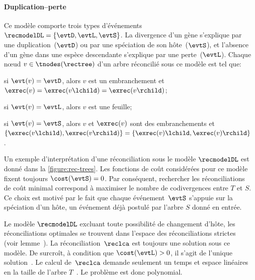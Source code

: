 \paragraph{Duplication--perte~\textup{\parencite{Goodman1979FittingGeneLineage,Page1994MapsTreesCladistic}}}
Ce modèle comporte trois types d’événements \(\recmodelDL = \{\evtD, \evtL, \evtS\}\).
La divergence d’un gène s’explique par une duplication~(\(\evtD\)) ou par une spéciation de son hôte~(\(\evtS\)), et l’absence d’un gène dans une espèce descendante s’explique par une perte~(\(\evtL\)).
Chaque nœud \(v \in \tnodes(\rectree)\) d’un arbre réconcilié sous ce modèle est tel que:
\begin{compactitemize}
\item si \(\evt(v) = \evtD\), alors \(v\) est un embranchement et \(\exrec(v) = \exrec(v\lchild) = \exrec(v\rchild)\);
    \item si \(\evt(v) = \evtL\), alors \(v\) est une feuille;
    \item si \(\evt(v) = \evtS\), alors \(v\) et \(\exrec(v)\) sont des embranchements et \(\{\exrec(v\lchild), \exrec(v\rchild)\} = \{\exrec(v)\lchild, \exrec(v)\rchild\}\).
\end{compactitemize}
Un exemple d’interprétation d’une réconciliation sous le modèle \(\recmodelDL\) est donné dans la \cref{figure:rec-trees}.
Les fonctions de coût considérées pour ce modèle fixent toujours \(\cost(\evtS) = 0\).
Par conséquent, rechercher les réconciliations de coût minimal correspond à maximiser le nombre de codivergences entre \(T\) et \(S\).
Ce choix est motivé par le fait que chaque événement~\(\evtS\) s’appuie sur la spéciation d’un hôte, un événement déjà postulé par l’arbre \(S\) donné en entrée.

Le modèle \(\recmodelDL\) excluant toute possibilité de changement d’hôte, les réconciliations optimales se trouvent dans l’espace des réconciliations strictes (voir lemme~).
La réconciliation~\(\reclca\) est toujours une solution sous ce modèle.
De surcroît, à condition que \(\cost(\evtL) > 0\), il s’agit de l’unique solution~\parencite{Chauve2009NewPerspectivesGene}.
Le calcul de~\(\reclca\) demande seulement un temps et espace linéaires en la taille de l’arbre \(T\)~\parencite{Zhang1997MirkinMuchnikSmith}.
Le problème  est donc polynomial.


